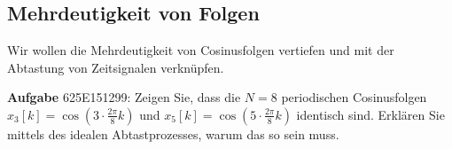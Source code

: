 \newpage
\subsection{Mehrdeutigkeit von Folgen}
\label{sec:625E151299}
\begin{Ziel}
Wir wollen die Mehrdeutigkeit von Cosinusfolgen vertiefen und mit
der Abtastung von Zeitsignalen verknüpfen.
\end{Ziel}
\textbf{Aufgabe} {\tiny 625E151299}: Zeigen Sie, dass die $N=8$ periodischen
Cosinusfolgen $x_3[k] = \cos(3\cdot\frac{2\pi}{8}k)$ und
$x_5[k] = \cos(5\cdot\frac{2\pi}{8}k)$
identisch sind.
%
Erklären Sie mittels des idealen Abtastprozesses, warum das so sein muss.
%
\begin{center}
\end{center}

